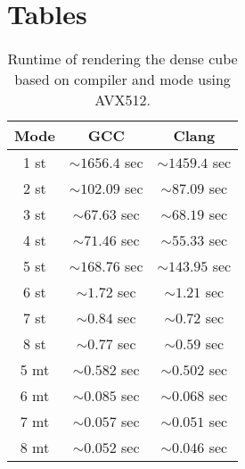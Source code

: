 \documentclass[a4paper, 11pt]{memoir}
\begin{document}
    \chapter{Tables}
    \begin{table}[H]
        \centering
        \begin{tabular}{|c | c | c|}
            \hline
            Mode & GCC              & Clang\\\hline
            1 st & $\sim1656.4$ sec & $\sim1459.4$ sec\\
            2 st & $\sim102.09$ sec & $\sim87.09$ sec\\
            3 st & $\sim67.63$ sec  & $\sim68.19$ sec\\
            4 st & $\sim71.46$ sec  & $\sim55.33$ sec\\
            5 st & $\sim168.76$ sec & $\sim143.95$ sec\\
            6 st & $\sim1.72$ sec   & $\sim1.21$ sec\\
            7 st & $\sim0.84$ sec   & $\sim0.72$ sec\\
            8 st & $\sim0.77$ sec   & $\sim0.59$ sec\\\hline\hline
            5 mt & $\sim0.582$ sec  & $\sim0.502$ sec\\
            6 mt & $\sim0.085$ sec  & $\sim0.068$ sec\\
            7 mt & $\sim0.057$ sec  & $\sim0.051$ sec\\
            8 mt & $\sim0.052$ sec  & $\sim0.046$ sec\\
            \hline
        \end{tabular}
        \caption{Runtime of rendering the dense cube based on compiler and mode using AVX512.}
        \label{tab:perf_dense_cube_avx512}
    \end{table}
\end{document}
